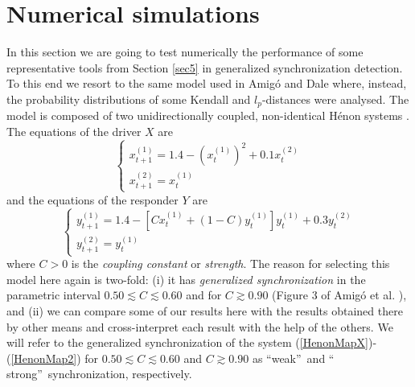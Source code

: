 \documentclass[%
 aip,
 amsmath,amssymb,
 reprint,%
]{revtex4-1}
\begin{document}

\section{Numerical simulations}

\label{sec7}

In this section we are going to test numerically the performance of some representative tools from Section \ref{sec5} in generalized synchronization detection. To
this end we resort to the same model used in Amig\'{o} and Dale \cite%
{Amigo2025} where, instead, the probability distributions of some Kendall and $l_{p}$-distances were analysed. The model is composed of two unidirectionally
coupled, non-identical H\'{e}non systems \cite{Schiff1996}. The equations of
the driver $X$ are%
\begin{equation}
\left\{ 
\begin{array}{l}
x_{t+1}^{(1)}=1.4-(x_{t}^{(1)}{})^{2}+0.1x_{t}^{(2)} \\ 
x_{t+1}^{(2)}=x_{t}^{(1)}%
\end{array}%
\right.   \label{HenonMapX}
\end{equation}%
and the equations of the responder $Y$ are 
\begin{equation}
\left\{ 
\begin{array}{l}
y_{t+1}^{(1)}=1.4-[Cx_{t}^{(1)}+(1-C)y_{t}^{(1)}{}]y_{t}^{(1)}+0.3y_{t}^{(2)}
\\ 
y_{t+1}^{(2)}=y_{t}^{(1)}%
\end{array}%
\right.   \label{HenonMap2}
\end{equation}%
where $C>0$ is the \textit{coupling constant} or \textit{strength}. The
reason for selecting this model here again is two-fold: (i) it has \textit{%
generalized synchronization} \cite{Rulkov1995,Rosenblum1997,Pikovsky2001} in
the parametric interval $0.50\lesssim C\lesssim 0.60$ and for $C\gtrsim 0.90$
(Figure 3 of Amig\'{o} et al. \cite{Amigo2024}), and (ii) we can compare
some of our results here with the results obtained there by other means and cross-interpret each result with the help of the others. We will refer to the generalized synchronization of the system (\ref{HenonMapX})-(\ref{HenonMap2}) for $0.50\lesssim C\lesssim 0.60$ and $C\gtrsim 0.90$
as \textquotedblleft weak\textquotedblright\ and \textquotedblleft
strong\textquotedblright\ synchronization, respectively.
\end{document}
